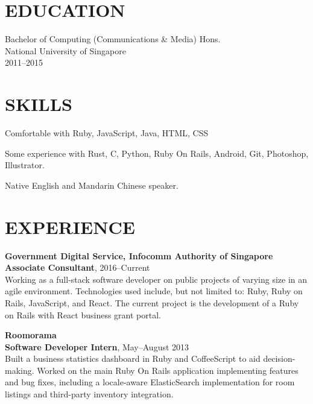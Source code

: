 \documentclass[line, margin]{res}
\makeatletter
\newcommand{\at}[0]{@}
\makeatother
\begin{document}
\address{
    \href{mailto:ng.guoyou+cv\at gmail.com}{ng.guoyou\at gmail.com}
    \href{http://github.com/gyng}{http://github.com/gyng}
}

\begin{resume}
    \section{EDUCATION}
        Bachelor of Computing (Communications \& Media) Hons. \\
        National University of Singapore \\
        2011--2015

    \section{SKILLS}
        Comfortable with Ruby, JavaScript, Java, HTML, CSS

        Some experience with Rust, C, Python, Ruby On Rails, Android, Git, Photoshop, Illustrator.

        Native English and Mandarin Chinese speaker.

    \section{EXPERIENCE}
        \textbf{Government Digital Service, Infocomm Authority of Singapore} \\
        \textbf{Associate Consultant}, 2016--Current \\
        Working as a full-stack software developer on public projects of varying size in an agile environment. Technologies used include, but not limited to: Ruby, Ruby on Rails, JavaScript, and React. The current project is the development of a Ruby on Rails with React business grant portal.

        \textbf{Roomorama} \\
        \textbf{Software Developer Intern}, May--August 2013 \\
        Built a business statistics dashboard in Ruby and CoffeeScript to aid decision-making. Worked on the main Ruby On Rails application implementing features and bug fixes, including a locale-aware ElasticSearch implementation for room listings and third-party inventory integration.


\end{resume}
\end{document}
